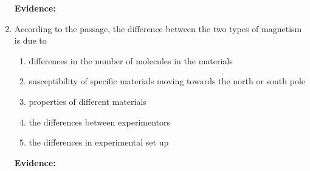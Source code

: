 \begin{enumerate}
\bigskip
\textbf{Evidence:} \hrulefill

\item According to the passage, the difference between the two types of magnetism is due to

\bigskip
\begin{enumerate}[label=(\Alph*)]
\item differences in the number of molecules in the materials
\item susceptibility of specific materials moving towards the north or south pole
\item properties of different materials
\item the differences between experimentors
\item the differences in experimental set up
\end{enumerate}

\bigskip
\textbf{Evidence:} \hrulefill

\end{enumerate} 









